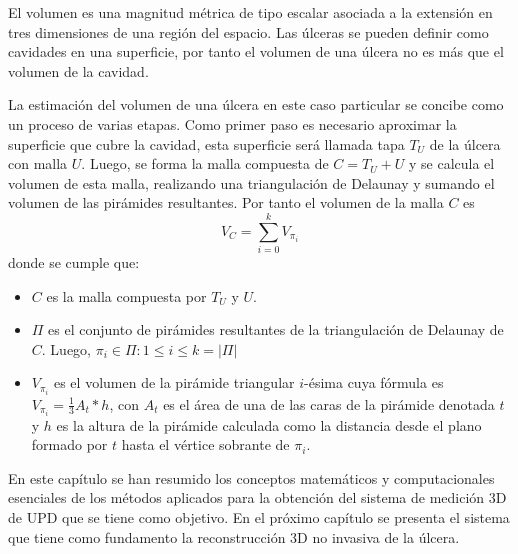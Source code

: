 El volumen es una magnitud métrica de tipo escalar asociada a la extensión en tres dimensiones de una región del espacio. Las úlceras se pueden definir como cavidades en una superficie, por tanto el volumen de una úlcera no es más que el volumen de la cavidad.

La estimación del volumen de una úlcera en este caso particular se concibe como un proceso de varias etapas.  Como primer paso es necesario aproximar la superficie que cubre la cavidad, esta superficie será llamada tapa $T_U$ de la úlcera con malla $U$. Luego, se forma la malla compuesta de $C = T_U + U$ y se calcula el volumen de esta malla, realizando una triangulación de Delaunay y sumando el volumen de las pirámides resultantes. Por tanto el volumen de la malla $C$ es
\begin{equation}
	V_C = \sum_{i = 0}^{k} V_{\pi_i}
\end{equation}
donde se cumple que: 
\begin{itemize}
	\item $C$ es la malla compuesta por $T_U$ y $U$.
	\item $\Pi$ es el conjunto de pirámides resultantes de la triangulación de Delaunay de $C$. Luego, $\pi_i \in \Pi: 1 \leq i \leq k = |\Pi|$
	\item $V_{\pi_i}$ es el volumen de la pirámide triangular $i$-ésima cuya fórmula es $V_{\pi_i} = \frac{1}{3}A_t * h$, con $A_t$ es el área de una de las caras de la pirámide denotada $t$ y $h$ es la altura de la pirámide calculada como la distancia desde el plano formado por $t$ hasta el vértice sobrante de $\pi_i$.
\end{itemize}

En este capítulo se han resumido los conceptos matemáticos y computacionales esenciales de los métodos aplicados para la obtención del sistema de medición 3D de UPD que se tiene como objetivo. En el próximo capítulo se presenta el sistema que tiene como fundamento la reconstrucción 3D no invasiva de la úlcera.


